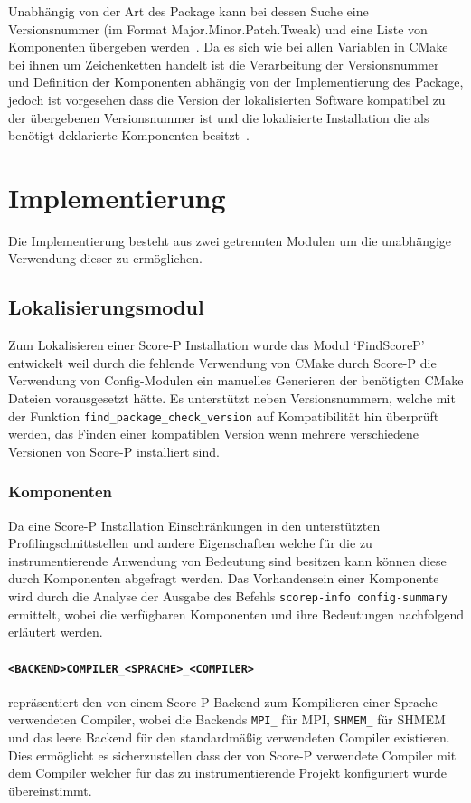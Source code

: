 \documentclass[german,proseminar,hyperref,utf8,lof]{zihpub}
\begin{document}
    Unabhängig von der Art des Package kann bei dessen Suche eine Versionsnummer
    (im Format Major.Minor.Patch.Tweak) und eine Liste von Komponenten übergeben
    werden~.
    Da es sich wie bei allen Variablen in CMake bei ihnen um Zeichenketten handelt ist die Verarbeitung
    der Versionsnummer und Definition der Komponenten abhängig von der Implementierung des Package,
    jedoch ist vorgesehen dass die Version der lokalisierten Software kompatibel zu der übergebenen
    Versionsnummer ist und die lokalisierte Installation die als benötigt deklarierte Komponenten
    besitzt~.

    \newpage
    \section{Implementierung}
    Die Implementierung besteht aus zwei getrennten Modulen um die unabhängige Verwendung dieser
    zu ermöglichen.

    \subsection{Lokalisierungsmodul}
    Zum Lokalisieren einer Score-P Installation wurde das Modul `FindScoreP' entwickelt weil
    durch die fehlende Verwendung von CMake durch Score-P die Verwendung von Config-Modulen
    ein manuelles Generieren der benötigten CMake Dateien vorausgesetzt hätte.
    Es unterstützt neben Versionsnummern, welche mit der Funktion \texttt{find\_package\_check\_version}
    auf Kompatibilität hin überprüft werden, das Finden einer kompatiblen Version wenn
    mehrere verschiedene Versionen von Score-P installiert sind.

    \subsubsection{Komponenten}
    Da eine Score-P Installation Einschränkungen in den unterstützten Profilingschnittstellen und
    andere Eigenschaften welche für die zu instrumentierende Anwendung von Bedeutung sind besitzen
    kann können diese durch Komponenten abgefragt werden.
    Das Vorhandensein einer Komponente wird durch die Analyse der Ausgabe des Befehls
    \texttt{scorep-info config-summary} ermittelt, wobei die verfügbaren Komponenten und ihre
    Bedeutungen nachfolgend erläutert werden.

    \paragraph{\texttt{<BACKEND>COMPILER\_<SPRACHE>\_<COMPILER>}} repräsentiert den von einem Score-P Backend
    zum Kompilieren einer Sprache verwendeten Compiler, wobei die Backends \texttt{MPI\_} für MPI,
    \texttt{SHMEM\_} für SHMEM und das leere Backend für den standardmä{\ss}ig verwendeten Compiler existieren.
    Dies ermöglicht es sicherzustellen dass der von Score-P verwendete Compiler mit dem Compiler
    welcher für das zu instrumentierende Projekt konfiguriert wurde übereinstimmt.
\end{document}

